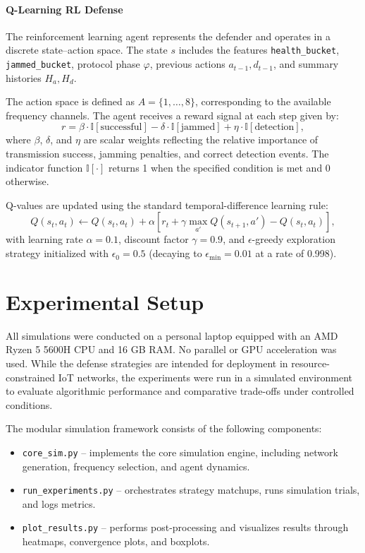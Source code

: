 \documentclass[conference]{IEEEtran}
\begin{document}
\paragraph{Q-Learning RL Defense}
The reinforcement learning agent represents the defender and operates in a discrete state–action space. The state $s$ includes the features \texttt{health\_bucket}, \texttt{jammed\_bucket}, protocol phase $\varphi$, previous actions $a_{t-1}, d_{t-1}$, and summary histories $H_a, H_d$.

The action space is defined as $A = \{1, \ldots, 8\}$, corresponding to the available frequency channels. The agent receives a reward signal at each step given by:
\[
r = \beta \cdot \mathbb{I}[\text{successful}] - \delta \cdot \mathbb{I}[\text{jammed}] + \eta \cdot \mathbb{I}[\text{detection}],
\]
where $\beta$, $\delta$, and $\eta$ are scalar weights reflecting the relative importance of transmission success, jamming penalties, and correct detection events. The indicator function $\mathbb{I}[\cdot]$ returns 1 when the specified condition is met and 0 otherwise.

Q-values are updated using the standard temporal-difference learning rule:
\[
Q(s_t, a_t) \leftarrow Q(s_t, a_t) + \alpha \left[ r_t + \gamma \max_{a'} Q(s_{t+1}, a') - Q(s_t, a_t) \right],
\]
with learning rate $\alpha = 0.1$, discount factor $\gamma = 0.9$, and $\epsilon$-greedy exploration strategy initialized with $\epsilon_0 = 0.5$ (decaying to $\epsilon_{\min} = 0.01$ at a rate of 0.998).


\section{Experimental Setup}

All simulations were conducted on a personal laptop equipped with an AMD Ryzen 5 5600H CPU and 16 GB RAM. No parallel or GPU acceleration was used. While the defense strategies are intended for deployment in resource-constrained IoT networks, the experiments were run in a simulated environment to evaluate algorithmic performance and comparative trade-offs under controlled conditions.

The modular simulation framework consists of the following components:
\begin{itemize}
    \item \texttt{core\_sim.py} – implements the core simulation engine, including network generation, frequency selection, and agent dynamics.
    \item \texttt{run\_experiments.py} – orchestrates strategy matchups, runs simulation trials, and logs metrics.
    \item \texttt{plot\_results.py} – performs post-processing and visualizes results through heatmaps, convergence plots, and boxplots.
\end{itemize}
\end{document}
